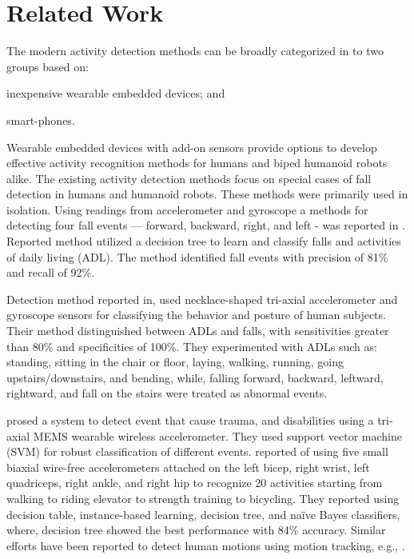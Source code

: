 \documentclass{IEEEtran}
\begin{document}
\section{Related Work}
\label{subSec:relatedWork}

The modern activity detection methods can be broadly categorized in to two groups based on: 
\begin{inparaenum}[($i$)] \item inexpensive wearable embedded devices; and \item smart-phones. 
\end{inparaenum} Wearable embedded devices with add-on sensors provide options to develop effective 
activity recognition methods for humans and biped humanoid robots alike. The existing activity 
detection methods focus on special cases of fall detection in humans and humanoid robots. These 
methods were primarily used in isolation.  Using readings from accelerometer and gyroscope a methods for detecting four fall events --- forward, backward, right, and left - was reported in \cite{ojetolaFallDetection2011}.  Reported method utilized  a decision tree to 
learn and classify falls and activities of daily living (ADL). The method identified fall events 
with precision of 81\%  and recall of 92\%. 

Detection method reported in\cite{baekFallDetection2013}, used necklace-shaped tri-axial
accelerometer  and  gyroscope  sensors  for classifying  the  behavior  and  posture  of  human
 subjects. Their method distinguished between  ADLs and  falls, with  sensitivities  greater  than 
 80\%  and specificities  of  100\%. They experimented with ADLs such as: standing, sitting in the 
 chair or floor, laying, walking, running, going upstairs/downstairs, and bending, while, 
 falling forward, backward, leftward, rightward, and fall on the stairs were treated as abnormal 
 events. 
 
\cite{leoneFallDetection2013} prosed a system to detect event that cause trauma, and disabilities
using a tri-axial MEMS wearable wireless accelerometer. They used support vector machine (SVM) for
robust classification of different events. \cite{BaoActivityrecognition2004} reported of using five 
small biaxial wire-free accelerometers attached  on the left bicep, right wrist, left quadriceps, 
right ankle, and right hip to recognize 20 activities starting from  walking  to  riding elevator  
to  strength  training to bicycling. They reported using decision table, instance-based learning, 
decision tree, and na\"{i}ve Bayes classifiers, where, decision tree showed the best performance 
with 84\% accuracy.  Similar efforts have been reported to detect human motions using motion 
tracking, e.g., 
\cite{dumitracheFallDetection2013,kumarActivitAndFallDetection2013,krishnanActivityRecognition2014,gaoActivityRecognition2014,alvarezActivityAndFallRecognotion2015}.
 
\end{document}
